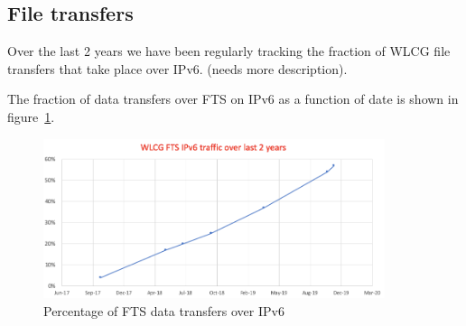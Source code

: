 
\subsection{File transfers}

Over the last 2 years we have been regularly tracking the fraction of WLCG file transfers that take place over IPv6.
(needs more description).

The fraction of data transfers over FTS on IPv6 as a function of date is shown in  figure~\ref{fig:FTS}.
\begin{figure}[h]
\centering
\includegraphics[width=10cm]{FTS}
\caption{Percentage of FTS data transfers over IPv6}
\label{fig:FTS}
\end{figure}
